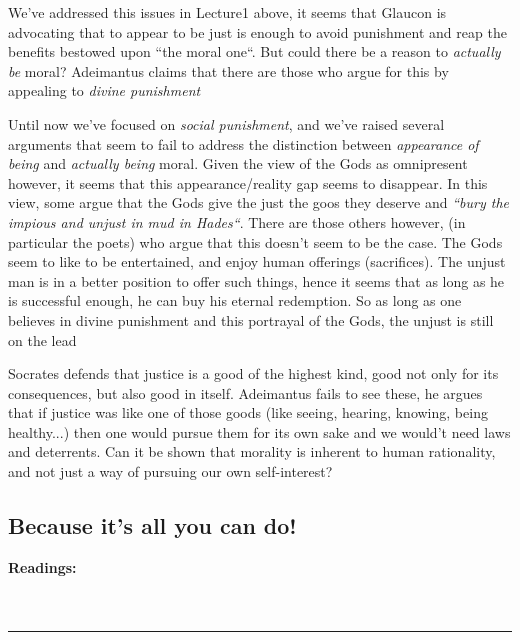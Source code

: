 \documentclass[english,course]{Notes}
\newcommand{\ita}[1]{\textit{#1}}
\newcommand\readings{\textbf{Readings:} \\}
\newcommand\sep{\\ \noindent\rule{10cm}{0.8pt} \\}
\begin{document}
\par{We've addressed this issues in Lecture1 above, it seems that Glaucon is advocating that to appear to be just is enough to avoid punishment and reap the benefits bestowed upon ``the moral one``. But could there be a reason to \ita{actually be} moral? Adeimantus claims that there are those who argue for this by appealing to \ita{divine punishment}}

\par{Until now we've focused on \ita{social punishment}, and we've raised several arguments that seem to fail to address the distinction between \ita{appearance of being} and \ita{actually being} moral. Given the view of the Gods as omnipresent however, it seems that this appearance/reality gap seems to disappear. In this view, some argue that the Gods give the just the goos they deserve and \ita{``bury the impious and unjust in mud in Hades``}. There are those others however, (in particular the poets) who argue that this doesn't seem to be the case. The Gods seem to like to be entertained, and enjoy human offerings (sacrifices). The unjust man is in a better position to offer such things, hence it seems that as long as he is successful enough, he can buy his eternal redemption. So as long as one believes in divine punishment and this portrayal of the Gods, the unjust is still on the lead}

\par{Socrates defends that justice is a good of the highest kind, good not only for its consequences, but also good in itself. Adeimantus fails to see these, he argues that if justice was like one of those goods (like seeing, hearing, knowing, being healthy...) then one would pursue them for its own sake and we would't need laws and deterrents. Can it be shown that morality is inherent to human rationality, and not just a way of pursuing our own self-interest?~}

\newpage


\subsection{Because it's all you can do!}

\readings \cite{PsychEgoism} \\ \cite{EthicalEgoism}
\sep
\end{document}
